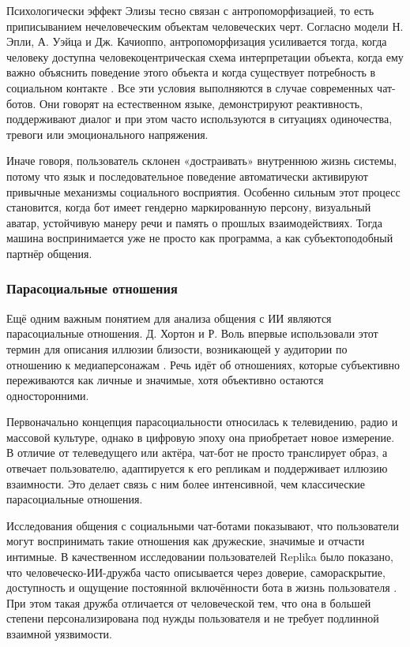 \documentclass[areasetadvanced]{scrartcl}
\begin{document}
Психологически эффект Элизы тесно связан с антропоморфизацией, то есть
приписыванием нечеловеческим объектам человеческих черт. Согласно
модели Н. Эпли, А. Уэйца и Дж. Качиоппо, антропоморфизация усиливается
тогда, когда человеку доступна человекоцентрическая схема
интерпретации объекта, когда ему важно объяснить поведение этого
объекта и когда существует потребность в социальном контакте
\cite{Epley2007}. Все эти условия выполняются в случае современных
чат-ботов. Они говорят на естественном языке, демонстрируют
реактивность, поддерживают диалог и при этом часто используются в
ситуациях одиночества, тревоги или эмоционального напряжения.

Иначе говоря, пользователь склонен «достраивать» внутреннюю жизнь
системы, потому что язык и последовательное поведение автоматически
активируют привычные механизмы социального восприятия. Особенно
сильным этот процесс становится, когда бот имеет гендерно
маркированную персону, визуальный аватар, устойчивую манеру речи и
память о прошлых взаимодействиях. Тогда машина воспринимается уже не
просто как программа, а как субъектоподобный партнёр общения.

\subsubsection{Парасоциальные отношения}

Ещё одним важным понятием для анализа общения с ИИ являются
парасоциальные отношения. Д. Хортон и Р. Воль впервые использовали
этот термин для описания иллюзии близости, возникающей у аудитории по
отношению к медиаперсонажам \cite{HortonWohl1956}. Речь идёт об
отношениях, которые субъективно переживаются как личные и значимые,
хотя объективно остаются односторонними.

Первоначально концепция парасоциальности относилась к телевидению,
радио и массовой культуре, однако в цифровую эпоху она приобретает
новое измерение. В отличие от телеведущего или актёра, чат-бот не
просто транслирует образ, а отвечает пользователю, адаптируется к его
репликам и поддерживает иллюзию взаимности. Это делает связь с ним
более интенсивной, чем классические парасоциальные отношения.

Исследования общения с социальными чат-ботами показывают, что
пользователи могут воспринимать такие отношения как дружеские,
значимые и отчасти интимные. В качественном исследовании пользователей
Replika было показано, что человеческо-ИИ-дружба часто описывается
через доверие, самораскрытие, доступность и ощущение постоянной
включённости бота в жизнь пользователя \cite{Brandtzaeg2022}. При этом
такая дружба отличается от человеческой тем, что она в большей степени
персонализирована под нужды пользователя и не требует подлинной
взаимной уязвимости.
\end{document}
